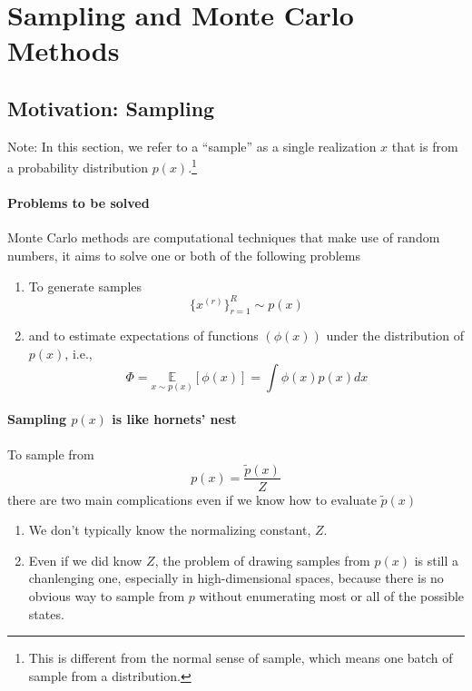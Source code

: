 \documentclass[11pt]{article}
\begin{document}
\section{Sampling and Monte Carlo Methods}
\subsection{Motivation: Sampling}
Note: In this section, we refer to a ``sample'' as a single realization $x$ that is from a probability distribution $p(x)$.\footnote{This is different from the normal sense of sample, which means one batch of sample from a distribution.}

\paragraph{Problems to be solved} Monte Carlo methods are computational techniques that make use of random numbers, it aims to solve one or both of the following problems
\begin{enumerate}
    \item To generate samples
        \begin{equation}
            \{x^{(r)}\}_{r=1}^{R} \sim p(x)
        \end{equation}
    \item and to estimate expectations of functions $(\phi(x) )$ under the distribution of $p(x)$, i.e.,
        \begin{equation}
            \Phi=\underset{x \sim p(x)}{\mathbb{E}}[\phi(x)]=\int \phi(x) p(x) d x
        \end{equation}
\end{enumerate}

\paragraph{Sampling $p(x)$ is like hornets' nest}
To sample from
\begin{equation}
    p(x)=\frac{\tilde{p}(x)}{Z}
\end{equation}
there are two main complications even if we know how to evaluate $\tilde p (x)$
\begin{enumerate}
    \item We don't typically know the normalizing constant, $Z$.
    \item Even if we did know $Z$, the problem of drawing samples from $p(x)$ is still a chanlenging one, especially in high-dimensional spaces, because there is no obvious way to sample from $p$ without enumerating most or all of the  possible states. 
\end{enumerate}
\end{document}
